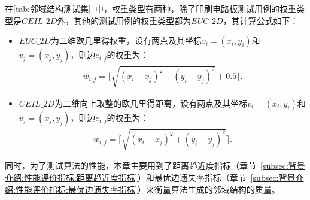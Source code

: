 \par
在\autoref{tab:邻域结构测试集}~中，权重类型\cite{reinelt1995tsplib95}有两种，除了印刷电路板测试用例的权重类型是$CEIL\_2D$外，其他的测试用例的权重类型都为$EUC\_2D$，其计算公式如下：
\begin{itemize}
    \item $EUC\_2D$为二维欧几里得权重，设有两点及其坐标$v_i = (x_i, y_i)$和$v_j = (x_j, y_j)$，则边$e_{i,j}$的权重为：
    \vspace{-1.5em}
    \begin{align}
        \label{eq:EUC2D}
        w_{i,j} = \lfloor \sqrt{(x_i-x_j)^2 + (y_i-y_j)^2} + 0.5 \rfloor .
    \end{align}
    \vspace{-1.5em}
    \item $CEIL\_2D$为二维向上取整的欧几里得距离，设有两点及其坐标$v_i = (x_i, y_i)$和$v_j = (x_j, y_j)$，则边$e_{i,j}$的权重为：
    \vspace{-1.5em}
    \begin{align}
        \label{eq:CEIL2D}
        w_{i,j} = \lceil \sqrt{(x_i-x_j)^2 + (y_i-y_j)^2} \rceil .
    \end{align}
\end{itemize}
\par
同时，为了测试算法的性能，本章主要用到了距离趋近度指标（章节~\ref{subsec:背景介绍:性能评价指标:距离趋近度指标}）和最优边遗失率指标（章节~\ref{subsec:背景介绍:性能评价指标:最优边遗失率指标}）来衡量算法生成的邻域结构的质量。


